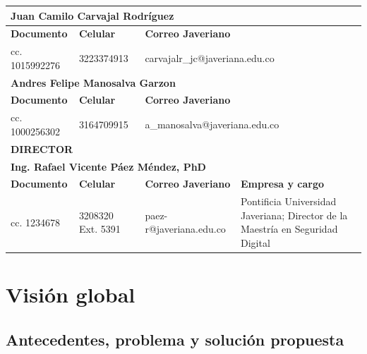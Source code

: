 \documentclass[12pt,a4paper]{article}
\begin{document}
\begin{center}
\begin{tabular}{|p{}|p{}|p{}|p{}|}
\multicolumn{4}{|p{0.96\textwidth}|}{\textbf{Juan Camilo Carvajal Rodríguez}} \\ \hline
\textbf{Documento} & \textbf{Celular} & \multicolumn{2}{p{0.60\textwidth}|}{\textbf{Correo Javeriano}} \\ \hline
cc. 1015992276 & 3223374913 & \multicolumn{2}{p{0.60\textwidth}|}{\scriptsize carvajalr\_jc@javeriana.edu.co} \\ \hline

\multicolumn{4}{|p{0.96\textwidth}|}{\textbf{Andres Felipe Manosalva Garzon}} \\ \hline
\textbf{Documento} & \textbf{Celular} & \multicolumn{2}{p{0.60\textwidth}|}{\textbf{Correo Javeriano}} \\ \hline
cc. 1000256302 & 3164709915 & \multicolumn{2}{p{0.60\textwidth}|}{\scriptsize a\_manosalva@javeriana.edu.co} \\ \hline

\multicolumn{4}{|p{0.96\textwidth}|}{\textbf{DIRECTOR}} \\ \hline

\multicolumn{4}{|p{0.96\textwidth}|}{\textbf{Ing. Rafael Vicente Páez Méndez, PhD}} \\ \hline
\textbf{Documento} & \textbf{Celular} & \textbf{Correo Javeriano} & \textbf{Empresa y cargo} \\ \hline
cc. 1234678 & 3208320 Ext. 5391 & \scriptsize paez-r@javeriana.edu.co & Pontificia Universidad Javeriana; Director de la Maestría en Seguridad Digital \\ \hline

\end{tabular}

\normalsize
\end{center}
\restoregeometry

\clearpage
\tableofcontents
\clearpage

\section{Visión global}

\subsection{Antecedentes, problema y solución propuesta}
\end{document}
